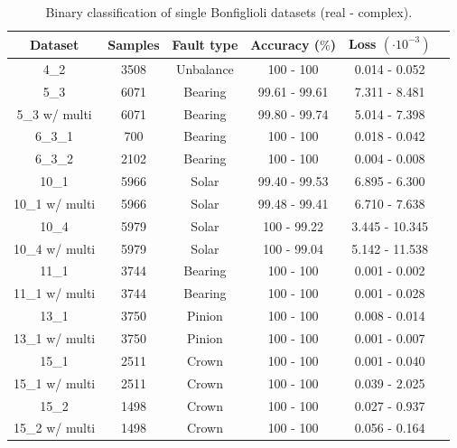 \documentclass[../main.tex]{subfiles}
\begin{document}
\begin{table}[ht]
	\centering
	\begin{tabular}{c | c c c c c}
		\toprule
		\textbf{Dataset} & \textbf{Samples} & \textbf{Fault type} & \textbf{Accuracy ($\%$)} & \textbf{Loss $(\cdot 10^{-3})$} \\
		\midrule
		4\_2           & 3508 & Unbalance & 100   - 100   & 0.014 - 0.052 \\
		5\_3           & 6071 & Bearing   & 99.61 - 99.61 & 7.311 - 8.481 \\
		5\_3 w/ multi  & 6071 & Bearing   & 99.80 - 99.74 & 5.014 - 7.398 \\
		6\_3\_1        & 700  & Bearing   & 100   - 100   & 0.018 - 0.042 \\
		6\_3\_2        & 2102 & Bearing   & 100   - 100   & 0.004 - 0.008 \\
		10\_1          & 5966 & Solar     & 99.40 - 99.53 & 6.895 - 6.300 \\
		10\_1 w/ multi & 5966 & Solar     & 99.48 - 99.41 & 6.710 - 7.638 \\
		10\_4 		   & 5979 & Solar     & 100   - 99.22 & 3.445 - 10.345\\
		10\_4 w/ multi & 5979 & Solar     & 100   - 99.04 & 5.142 - 11.538\\
		11\_1      	   & 3744 & Bearing   & 100   - 100   & 0.001 - 0.002 \\
		11\_1 w/ multi & 3744 & Bearing   & 100   - 100   & 0.001 - 0.028 \\
		13\_1          & 3750 & Pinion    & 100   - 100   & 0.008 - 0.014 \\
		13\_1 w/ multi & 3750 & Pinion    & 100   - 100   & 0.001 - 0.007 \\
		15\_1          & 2511 & Crown     & 100   - 100   & 0.001 - 0.040 \\
		15\_1 w/ multi & 2511 & Crown     & 100   - 100   & 0.039 - 2.025 \\
		15\_2          & 1498 & Crown     & 100   - 100   & 0.027 - 0.937 \\
		15\_2 w/ multi & 1498 & Crown     & 100   - 100   & 0.056 - 0.164 \\
		\bottomrule
	\end{tabular}
	\caption{Binary classification of single Bonfiglioli datasets (real - complex).}
	\label{tab:bonfigloli_ds_results}
\end{table}


\end{document}
